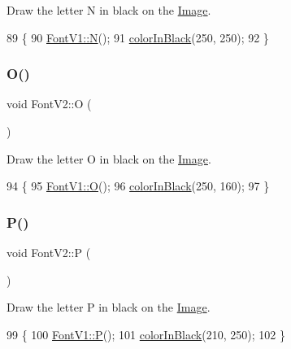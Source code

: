 Draw the letter N in black on the \mbox{\hyperlink{class_image}{Image}}. 


\begin{DoxyCode}
89                \{
90     \mbox{\hyperlink{class_font_v1_a725c93ea00d851ca5b43c0d594f1d6d0}{FontV1::N}}();
91     \mbox{\hyperlink{class_font_v2_a04f2501961bc286ce70fbb6a840b0e8a}{colorInBlack}}(250, 250);
92 \}
\end{DoxyCode}
\mbox{\label{class_font_v2_afb1d85a50e3982f0f1e77d5e1ca7f53c}} 
\subsubsection{\texorpdfstring{O()}{O()}}
{\footnotesize\ttfamily void Font\+V2\+::O (\begin{DoxyParamCaption}{ }\end{DoxyParamCaption})}



Draw the letter O in black on the \mbox{\hyperlink{class_image}{Image}}. 


\begin{DoxyCode}
94                \{
95     \mbox{\hyperlink{class_font_v1_a9338f8d780e9913a848310355973ebf3}{FontV1::O}}();
96     \mbox{\hyperlink{class_font_v2_a04f2501961bc286ce70fbb6a840b0e8a}{colorInBlack}}(250, 160);
97 \}
\end{DoxyCode}
\mbox{\label{class_font_v2_ab47b245b84ea5c1dd89055c83b6ea052}} 
\subsubsection{\texorpdfstring{P()}{P()}}
{\footnotesize\ttfamily void Font\+V2\+::P (\begin{DoxyParamCaption}{ }\end{DoxyParamCaption})}



Draw the letter P in black on the \mbox{\hyperlink{class_image}{Image}}. 


\begin{DoxyCode}
99                \{
100     \mbox{\hyperlink{class_font_v1_aeaf56ebe48a78aedf53626f50f10ee4d}{FontV1::P}}();
101     \mbox{\hyperlink{class_font_v2_a04f2501961bc286ce70fbb6a840b0e8a}{colorInBlack}}(210, 250);
102 \}
\end{DoxyCode}
\mbox{\label{class_font_v2_af8e979a962becf153ecc82051ad2c8fc}} 
